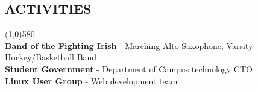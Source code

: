 \documentclass[10pt]{article}
\begin{document}
  \vspace{-8pt}
  \subsection*{\fontsize{10}{-10}\selectfont ACTIVITIES}
    \vspace{-16pt}
    \line(1,0){580}\\
    \textbf{Band of the Fighting Irish}
    -
    Marching Alto Saxophone, Varsity Hockey/Basketball Band
    \\
    \textbf{Student Government}
    -
    Department of Campus technology CTO
    \\
    \textbf{Linux User Group}
    -
    Web development team
    
\end{document}
